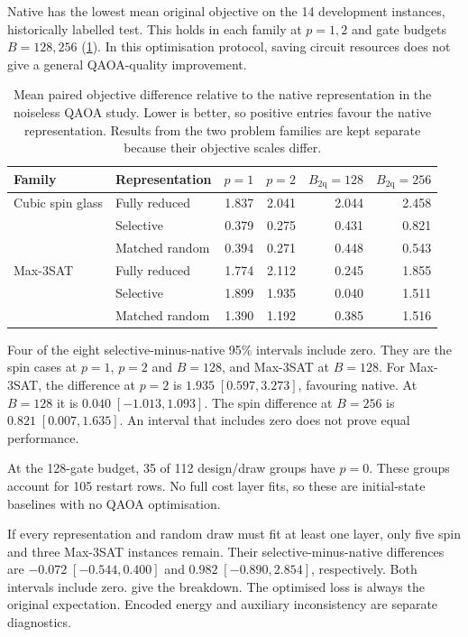 \documentclass[a4paper,onecolumn,11pt,unpublished]{quantumarticle}
\theoremstyle{remark}
\begin{document}
Native has the lowest mean original objective on the 14 development
instances, historically labelled test. This holds in each family at
$p=1,2$ and gate budgets $B=128,256$ (\cref{tab:e3-qaoa-summary}).
In this optimisation protocol, saving circuit resources does not give a
general QAOA-quality improvement.

\begin{table}[!htbp]
    \centering
    \small
    \caption{Mean paired objective difference relative to the native
    representation in the noiseless QAOA study.  Lower is better, so positive
    entries favour the native representation.  Results from the two problem
    families are kept separate because their objective scales differ.}
    \label{tab:e3-qaoa-summary}
    \begin{tabular}{@{}llrrrr@{}}
        \toprule
        Family & Representation
        & $p=1$ & $p=2$
        & $B_{\mathrm{2q}}=128$
        & $B_{\mathrm{2q}}=256$\\
        \midrule
        Cubic spin glass
        & Fully reduced  & 1.837 & 2.041 & 2.044 & 2.458\\
        & Selective      & 0.379 & 0.275 & 0.431 & 0.821\\
        & Matched random & 0.394 & 0.271 & 0.448 & 0.543\\
        \addlinespace
        Max-3SAT
        & Fully reduced  & 1.774 & 2.112 & 0.245 & 1.855\\
        & Selective      & 1.899 & 1.935 & 0.040 & 1.511\\
        & Matched random & 1.390 & 1.192 & 0.385 & 1.516\\
        \bottomrule
    \end{tabular}
\end{table}

Four of the eight selective-minus-native 95\% intervals include zero.
They are the spin cases at $p=1$, $p=2$ and $B=128$, and Max-3SAT at $B=128$.
For Max-3SAT, the difference at $p=2$ is $1.935\;[0.597,3.273]$, favouring
native. At $B=128$ it is $0.040\;[-1.013,1.093]$.
The spin difference at $B=256$ is $0.821\;[0.007,1.635]$.
An interval that includes zero does not prove equal performance.

At the 128-gate budget, 35 of 112 design/draw groups have $p=0$.
These groups account for 105 restart rows. No full cost layer fits, so
these are initial-state baselines with no QAOA optimisation.

If every representation and random draw must fit at least one layer,
only five spin and three Max-3SAT instances remain.
Their selective-minus-native differences are $-0.072\;[-0.544,0.400]$ and
$0.982\;[-0.890,2.854]$, respectively. Both intervals include zero.
 give the breakdown.
The optimised loss is always the original expectation.
Encoded energy and auxiliary inconsistency are separate diagnostics.
\end{document}
